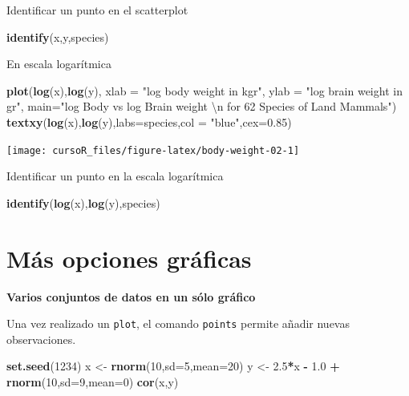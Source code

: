 \documentclass[]{book}
\newenvironment{Shaded}{\begin{snugshade}}{\end{snugshade}}
\newcommand{\KeywordTok}[1]{\textcolor[rgb]{0.13,0.29,0.53}{\textbf{#1}}}
\newcommand{\DataTypeTok}[1]{\textcolor[rgb]{0.13,0.29,0.53}{#1}}
\newcommand{\DecValTok}[1]{\textcolor[rgb]{0.00,0.00,0.81}{#1}}
\newcommand{\FloatTok}[1]{\textcolor[rgb]{0.00,0.00,0.81}{#1}}
\newcommand{\CharTok}[1]{\textcolor[rgb]{0.31,0.60,0.02}{#1}}
\newcommand{\StringTok}[1]{\textcolor[rgb]{0.31,0.60,0.02}{#1}}
\newcommand{\OperatorTok}[1]{\textcolor[rgb]{0.81,0.36,0.00}{\textbf{#1}}}
\newcommand{\NormalTok}[1]{#1}
\begin{document}
Identificar un punto en el scatterplot

\begin{Shaded}
\begin{Highlighting}[]
\KeywordTok{identify}\NormalTok{(x,y,species)}
\end{Highlighting}
\end{Shaded}

En escala logarítmica

\begin{Shaded}
\begin{Highlighting}[]
\KeywordTok{plot}\NormalTok{(}\KeywordTok{log}\NormalTok{(x),}\KeywordTok{log}\NormalTok{(y), }\DataTypeTok{xlab =} \StringTok{"log body weight in kgr"}\NormalTok{, }\DataTypeTok{ylab =} \StringTok{"log brain weight in gr"}\NormalTok{, }
     \DataTypeTok{main=}\StringTok{"log Body vs log Brain weight }\CharTok{\textbackslash{}n}\StringTok{ for 62 Species of Land Mammals"}\NormalTok{)}
\KeywordTok{textxy}\NormalTok{(}\KeywordTok{log}\NormalTok{(x),}\KeywordTok{log}\NormalTok{(y),}\DataTypeTok{labs=}\NormalTok{species,}\DataTypeTok{col =} \StringTok{"blue"}\NormalTok{,}\DataTypeTok{cex=}\FloatTok{0.85}\NormalTok{) }
\end{Highlighting}
\end{Shaded}

\begin{center}\texttt{[image: cursoR\_files/figure-latex/body-weight-02-1]} \end{center}

Identificar un punto en la escala logarítmica

\begin{Shaded}
\begin{Highlighting}[]
\KeywordTok{identify}\NormalTok{(}\KeywordTok{log}\NormalTok{(x),}\KeywordTok{log}\NormalTok{(y),species)}
\end{Highlighting}
\end{Shaded}

\section{Más opciones gráficas}\label{muxe1s-opciones-gruxe1ficas}

\textbf{Varios conjuntos de datos en un sólo gráfico}

Una vez realizado un \texttt{plot}, el comando \texttt{points} permite
añadir nuevas observaciones.

\begin{Shaded}
\begin{Highlighting}[]
\KeywordTok{set.seed}\NormalTok{(}\DecValTok{1234}\NormalTok{)}
\NormalTok{ x <-}\StringTok{ }\KeywordTok{rnorm}\NormalTok{(}\DecValTok{10}\NormalTok{,}\DataTypeTok{sd=}\DecValTok{5}\NormalTok{,}\DataTypeTok{mean=}\DecValTok{20}\NormalTok{)}
\NormalTok{ y <-}\StringTok{ }\FloatTok{2.5}\OperatorTok{*}\NormalTok{x }\OperatorTok{-}\StringTok{ }\FloatTok{1.0} \OperatorTok{+}\StringTok{ }\KeywordTok{rnorm}\NormalTok{(}\DecValTok{10}\NormalTok{,}\DataTypeTok{sd=}\DecValTok{9}\NormalTok{,}\DataTypeTok{mean=}\DecValTok{0}\NormalTok{)}
 \KeywordTok{cor}\NormalTok{(x,y)}
\end{Highlighting}
\end{Shaded}
\end{document}
